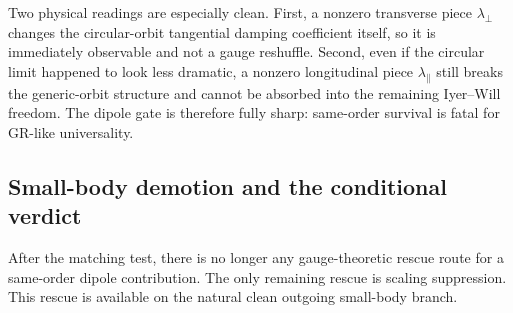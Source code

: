 \documentclass[11pt]{article}
\begin{document}
Two physical readings are especially clean.  First, a nonzero transverse piece
$\lambda_\perp$ changes the circular-orbit tangential damping coefficient itself,
so it is immediately observable and not a gauge reshuffle.  Second, even if the
circular limit happened to look less dramatic, a nonzero longitudinal piece
$\lambda_\parallel$ still breaks the generic-orbit structure and cannot be
absorbed into the remaining Iyer--Will freedom.  The dipole gate is therefore
fully sharp: same-order survival is fatal for GR-like universality.

\subsection{Small-body demotion and the conditional verdict}
\label{sec:dipole-audit-smallbody}

After the matching test, there is no longer any gauge-theoretic rescue route for
a same-order dipole contribution.  The only remaining rescue is scaling
suppression.  This rescue is available on the natural clean outgoing small-body
branch.
\end{document}

